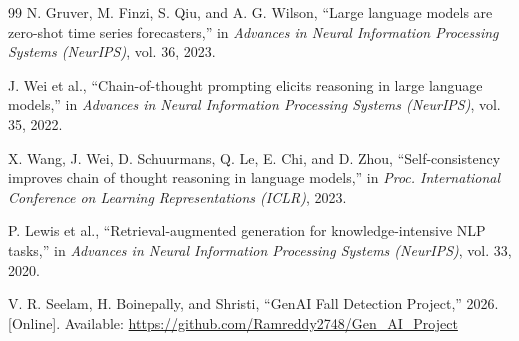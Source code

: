 \documentclass[conference]{IEEEtran}
\begin{document}
\begin{thebibliography}{99}
N. Gruver, M. Finzi, S. Qiu, and A. G. Wilson, ``Large language models are zero-shot time series forecasters,'' in \textit{Advances in Neural Information Processing Systems (NeurIPS)}, vol. 36, 2023.

J. Wei et al., ``Chain-of-thought prompting elicits reasoning in large language models,'' in \textit{Advances in Neural Information Processing Systems (NeurIPS)}, vol. 35, 2022.

X. Wang, J. Wei, D. Schuurmans, Q. Le, E. Chi, and D. Zhou, ``Self-consistency improves chain of thought reasoning in language models,'' in \textit{Proc. International Conference on Learning Representations (ICLR)}, 2023.

P. Lewis et al., ``Retrieval-augmented generation for knowledge-intensive NLP tasks,'' in \textit{Advances in Neural Information Processing Systems (NeurIPS)}, vol. 33, 2020.

V. R. Seelam, H. Boinepally, and Shristi, ``GenAI Fall Detection Project,'' 2026. [Online]. Available: \url{https://github.com/Ramreddy2748/Gen_AI_Project}

\end{thebibliography}
\end{document}
